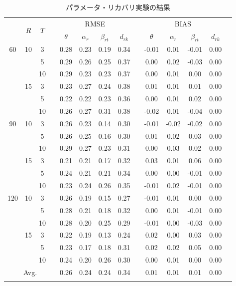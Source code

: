 \documentclass[a4paper,11pt,oneside,openany]{jsbook}
\newcommand{\bhline}[1]{\noalign{\hrule height #1}}
\begin{document}
\begin{table}[tb]
\begin{center}
\caption{パラメータ・リカバリ実験の結果}
\setlength{\tabcolsep}{5.pt}
\begin{tabular}{cccccccccccccc}  
\bhline{1pt}
\multirow{2}{*}{$J$} & \multirow{2}{*}{$R$} & \multirow{2}{*}{$T$}  && \multicolumn{4}{c}{RMSE} &&   \multicolumn{4}{c}{BIAS}  \\
\cline{5-8}\cline{10-13}
  & & & & $\theta$ & $\alpha_r$ & $\beta_{rt}$ & $d_{rk}$ &  & $\theta$ & $\alpha_r$ & $\beta_{rt}$ & $d_{rk}$ \\
\bhline{1pt}
60 & 10 & 3  && 0.28 & 0.23 & 0.19 & 0.34 && -0.01 & 0.01 & -0.01 & 0.00 \\
   &    & 5  && 0.29 & 0.26 & 0.25 & 0.37 && 0.00  & 0.02 & -0.03 & 0.00 \\
   &    & 10 && 0.29 & 0.23 & 0.23 & 0.37 && 0.00  & 0.01 & 0.00  & 0.00 \\
\cline{2-14}
   & 15 & 3  && 0.23 & 0.27 & 0.24 & 0.38 && 0.01  & 0.01 & 0.01  & 0.00 \\
   &    & 5  && 0.22 & 0.22 & 0.23 & 0.36 && 0.00  & 0.01 & 0.02  & 0.00 \\
   &    & 10 && 0.26 & 0.27 & 0.31 & 0.38 && -0.02 & 0.01 & -0.04 & 0.00 \\
\hline
90 & 10 & 3  && 0.26 & 0.23 & 0.14 & 0.30 && -0.01 & -0.02 & -0.02 & 0.00 \\
   &    & 5  && 0.26 & 0.25 & 0.16 & 0.30 && 0.01  & 0.02  & 0.03  & 0.00 \\
   &    & 10 && 0.29 & 0.27 & 0.23 & 0.31 && 0.00  & 0.03  & 0.02  & 0.00 \\
\cline{2-14}
& 15 & 3  && 0.21 & 0.21 & 0.17 & 0.32 && 0.03  & 0.01 & 0.06  & 0.00 \\
&    & 5  && 0.24 & 0.21 & 0.21 & 0.34 && 0.00  & 0.00 & -0.01 & 0.00\\
&    & 10 && 0.23 & 0.24 & 0.26 & 0.35 && -0.01 & 0.02 & -0.01 & 0.00\\
\hline
120 & 10 & 3  && 0.26 & 0.19 & 0.15 & 0.27 && -0.01 & 0.01 & 0.00  & 0.00 \\
    &    & 5  && 0.28 & 0.21 & 0.18 & 0.32 && 0.00  & 0.01 & -0.01 & 0.00 \\
    &    & 10 && 0.28 & 0.20 & 0.25 & 0.29 && -0.01 & 0.00 & -0.03 & 0.00\\
\cline{2-14}
& 15 & 3  && 0.22 & 0.19 & 0.13 & 0.24 && 0.02 & 0.00 & 0.03 & 0.00 \\
&    & 5  && 0.23 & 0.17 & 0.18 & 0.31 && 0.02 & 0.02 & 0.05 & 0.00 \\
&    & 10 && 0.24 & 0.20 & 0.26 & 0.30 && 0.00 & 0.01 & 0.00 & 0.00 \\
\hline
\multicolumn{4}{c}{Avg.}   &  0.26 & 0.24 & 0.24 & 0.34 &  & 0.01 & 0.01 & 0.01 & 0.00 & \\
\bhline{1pt}
\end{tabular}
\label{parameters_recovery}
\end{center}
\end{table}
\end{document}

